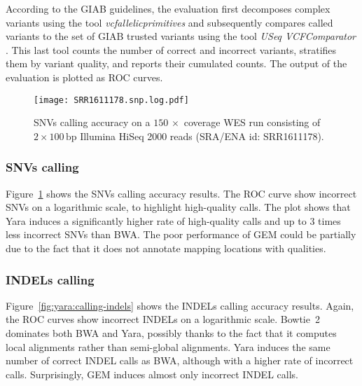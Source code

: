 According to the GIAB guidelines, the evaluation first decomposes complex variants using the tool \emph{vcfallelicprimitives} \citep{Danecek2011} and subsequently compares called variants to the set of GIAB trusted variants using the tool \emph{USeq VCFComparator} \citep{Nix2008}.
This last tool counts the number of correct and incorrect variants, stratifies them by variant quality, and reports their cumulated counts.
The output of the evaluation is plotted as ROC curves.

\begin{figure}[t]
\begin{center}
\caption[Yara SNVs calling accuracy]{SNVs calling accuracy on a $150\, \times$ coverage WES run consisting of $2 \times 100\,\text{bp}$ Illumina HiSeq 2000 reads (SRA/ENA id: SRR1611178).}
\label{fig:yara:calling-snps}
\texttt{[image: SRR1611178.snp.log.pdf]}
\end{center}
\end{figure}


\subsubsection{SNVs calling}
Figure~\ref{fig:yara:calling-snps} shows the SNVs calling accuracy results.
The ROC curve show incorrect SNVs on a logarithmic scale, to highlight high-quality calls.
The plot shows that Yara induces a significantly higher rate of high-quality calls and up to 3 times less incorrect SNVs than BWA.
The poor performance of GEM could be partially due to the fact that it does not annotate mapping locations with qualities.

\subsubsection{INDELs calling}
Figure~\ref{fig:yara:calling-indels} shows the INDELs calling accuracy results.
Again, the ROC curves show incorrect INDELs on a logarithmic scale.
Bowtie~2 dominates both BWA and Yara, possibly thanks to the fact that it computes local alignments rather than semi-global alignments.
Yara induces the same number of correct INDEL calls as BWA, although with a higher rate of incorrect calls.
Surprisingly, GEM induces almost only incorrect INDEL calls.

